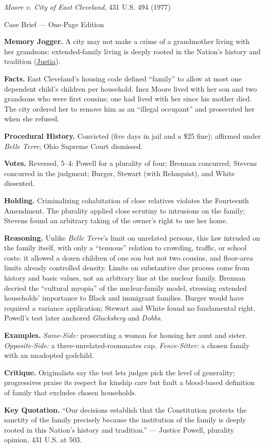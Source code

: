 \documentclass[12pt]{article}
\begin{document}
\begin{center}
{\Large \textit{Moore v. City of East Cleveland}, 431 U.S. 494 (1977)\par}
\vspace{0.3em}
{\normalsize Case Brief --- One-Page Edition\par}
\end{center}

\textbf{Memory Jogger.} A city may not make a crime of a grandmother living with her grandsons: extended-family living is deeply rooted in the Nation's history and tradition (\href{https://supreme.justia.com/cases/federal/us/431/494/}{Justia}).

\textbf{Facts.} East Cleveland's housing code defined ``family'' to allow at most one dependent child's children per household. Inez Moore lived with her son and two grandsons who were first cousins; one had lived with her since his mother died. The city ordered her to remove him as an ``illegal occupant'' and prosecuted her when she refused.

\textbf{Procedural History.} Convicted (five days in jail and a \$25 fine); affirmed under \textit{Belle Terre}; Ohio Supreme Court dismissed.

\textbf{Votes.} Reversed, 5--4: Powell for a plurality of four; Brennan concurred; Stevens concurred in the judgment; Burger, Stewart (with Rehnquist), and White dissented.

\textbf{Holding.} Criminalizing cohabitation of close relatives violates the Fourteenth Amendment. The plurality applied close scrutiny to intrusions on the family; Stevens found an arbitrary taking of the owner's right to use her home.

\textbf{Reasoning.} Unlike \textit{Belle Terre}'s limit on unrelated persons, this law intruded on the family itself, with only a ``tenuous'' relation to crowding, traffic, or school costs: it allowed a dozen children of one son but not two cousins, and floor-area limits already controlled density. Limits on substantive due process come from history and basic values, not an arbitrary line at the nuclear family. Brennan decried the ``cultural myopia'' of the nuclear-family model, stressing extended households' importance to Black and immigrant families. Burger would have required a variance application; Stewart and White found no fundamental right. Powell's test later anchored \textit{Glucksberg} and \textit{Dobbs}.

\textbf{Examples.} \emph{Same-Side:} prosecuting a woman for housing her aunt and sister. \emph{Opposite-Side:} a three-unrelated-roommates cap. \emph{Fence-Sitter:} a chosen family with an unadopted godchild.

\textbf{Critique.} Originalists say the test lets judges pick the level of generality; progressives praise its respect for kinship care but fault a blood-based definition of family that excludes chosen households.

\textbf{Key Quotation.} ``Our decisions establish that the Constitution protects the sanctity of the family precisely because the institution of the family is deeply rooted in this Nation's history and tradition.'' --- Justice Powell, plurality opinion, 431 U.S. at 503.
\end{document}
